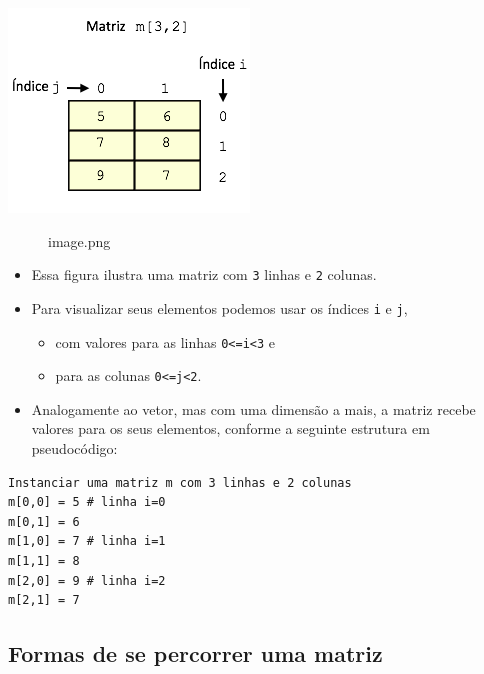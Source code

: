 \documentclass[12pt,a4paper]{article}
\providecommand{\tightlist}{%
      \setlength{\itemsep}{0pt}\setlength{\parskip}{0pt}}
\begin{document}
\includegraphics{"figs/image40.png"}

    \begin{figure}
\centering
\caption{image.png}
\end{figure}

    \begin{itemize}
\tightlist
\item
  Essa figura ilustra uma matriz com \texttt{3} linhas e \texttt{2}
  colunas.
\item
  Para visualizar seus elementos podemos usar os índices \texttt{i} e
  \texttt{j},

  \begin{itemize}
  \tightlist
  \item
    com valores para as linhas \texttt{0\textless{}=i\textless{}3} e
  \item
    para as colunas \texttt{0\textless{}=j\textless{}2}.
  \end{itemize}
\item
  Analogamente ao vetor, mas com uma dimensão a mais, a matriz recebe
  valores para os seus elementos, conforme a seguinte estrutura em
  pseudocódigo:
\end{itemize}

    \begin{verbatim}
Instanciar uma matriz m com 3 linhas e 2 colunas
m[0,0] = 5 # linha i=0
m[0,1] = 6
m[1,0] = 7 # linha i=1
m[1,1] = 8
m[2,0] = 9 # linha i=2
m[2,1] = 7
\end{verbatim}

    \hypertarget{formas-de-se-percorrer-uma-matriz}{%
\subsection{Formas de se percorrer uma
matriz}\label{formas-de-se-percorrer-uma-matriz}}
\end{document}
